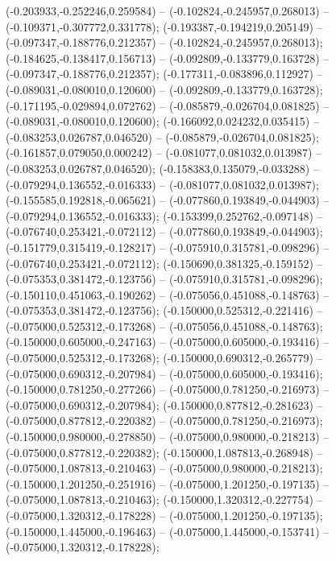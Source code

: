  (-0.203933,-0.252246,0.259584) -- (-0.102824,-0.245957,0.268013) -- (-0.109371,-0.307772,0.331778);
 (-0.193387,-0.194219,0.205149) -- (-0.097347,-0.188776,0.212357) -- (-0.102824,-0.245957,0.268013);
 (-0.184625,-0.138417,0.156713) -- (-0.092809,-0.133779,0.163728) -- (-0.097347,-0.188776,0.212357);
 (-0.177311,-0.083896,0.112927) -- (-0.089031,-0.080010,0.120600) -- (-0.092809,-0.133779,0.163728);
 (-0.171195,-0.029894,0.072762) -- (-0.085879,-0.026704,0.081825) -- (-0.089031,-0.080010,0.120600);
 (-0.166092,0.024232,0.035415) -- (-0.083253,0.026787,0.046520) -- (-0.085879,-0.026704,0.081825);
 (-0.161857,0.079050,0.000242) -- (-0.081077,0.081032,0.013987) -- (-0.083253,0.026787,0.046520);
 (-0.158383,0.135079,-0.033288) -- (-0.079294,0.136552,-0.016333) -- (-0.081077,0.081032,0.013987);
 (-0.155585,0.192818,-0.065621) -- (-0.077860,0.193849,-0.044903) -- (-0.079294,0.136552,-0.016333);
 (-0.153399,0.252762,-0.097148) -- (-0.076740,0.253421,-0.072112) -- (-0.077860,0.193849,-0.044903);
 (-0.151779,0.315419,-0.128217) -- (-0.075910,0.315781,-0.098296) -- (-0.076740,0.253421,-0.072112);
 (-0.150690,0.381325,-0.159152) -- (-0.075353,0.381472,-0.123756) -- (-0.075910,0.315781,-0.098296);
 (-0.150110,0.451063,-0.190262) -- (-0.075056,0.451088,-0.148763) -- (-0.075353,0.381472,-0.123756);
 (-0.150000,0.525312,-0.221416) -- (-0.075000,0.525312,-0.173268) -- (-0.075056,0.451088,-0.148763);
 (-0.150000,0.605000,-0.247163) -- (-0.075000,0.605000,-0.193416) -- (-0.075000,0.525312,-0.173268);
 (-0.150000,0.690312,-0.265779) -- (-0.075000,0.690312,-0.207984) -- (-0.075000,0.605000,-0.193416);
 (-0.150000,0.781250,-0.277266) -- (-0.075000,0.781250,-0.216973) -- (-0.075000,0.690312,-0.207984);
 (-0.150000,0.877812,-0.281623) -- (-0.075000,0.877812,-0.220382) -- (-0.075000,0.781250,-0.216973);
 (-0.150000,0.980000,-0.278850) -- (-0.075000,0.980000,-0.218213) -- (-0.075000,0.877812,-0.220382);
 (-0.150000,1.087813,-0.268948) -- (-0.075000,1.087813,-0.210463) -- (-0.075000,0.980000,-0.218213);
 (-0.150000,1.201250,-0.251916) -- (-0.075000,1.201250,-0.197135) -- (-0.075000,1.087813,-0.210463);
 (-0.150000,1.320312,-0.227754) -- (-0.075000,1.320312,-0.178228) -- (-0.075000,1.201250,-0.197135);
 (-0.150000,1.445000,-0.196463) -- (-0.075000,1.445000,-0.153741) -- (-0.075000,1.320312,-0.178228);
